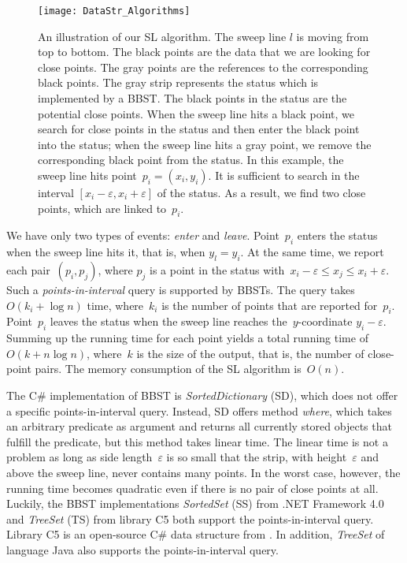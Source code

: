 \begin{figure}[tb]
\centering
\texttt{[image: DataStr\_Algorithms]}
\caption{An illustration of our SL algorithm.
	The sweep line $l$ is moving from top to bottom.
	The black points are the data that 
	we are looking for close points.
	The gray points are the references 
	to the corresponding black points.
	The gray strip represents the status which is 
	implemented by a BBST.
	The black points in the status are 
    the potential close points.
	When the sweep line hits a black point,
	we search for close points in the status and then
	enter the black point into the status;
	when the sweep line hits a gray point, 
	we remove the corresponding black point from the status.
	In this example, the sweep line hits point~$p_i=(x_i, y_i)$. 
	It is sufficient to search in the interval
	$[x_i-\varepsilon, x_i+\varepsilon]$ of the status.
	As a result, we find two close points, 
	which are linked to~$p_i$.
}
\label{fig:DataStr_SL}
\end{figure}

We have only two types of events: \emph{enter} and \emph{leave}.
Point~$p_{i} $ enters the status when the sweep line hits 
it, that is, when $y_{l}=y_{i}$. 
At the same time, we report each pair~$(p_{i},p_{j})$, where 
$p_{j}$ is a point in the status 
with~$x_{i}-\varepsilon \le x_{j}\le x_{i}+\varepsilon$. 
Such a \emph{points-in-interval} query is supported by BBSTs. 
The query takes~$O(k_{i}+\log n)$ time, 
where~$k_{i}$ is the number of points 
that are reported for~$p_{i}$.
Point~$p_{i}$ leaves the status 
when the sweep line reaches the~$y$-coordinate 
$y_{i}-\varepsilon$.
Summing up the running time for each point
yields a total running time of~$O(k+n\log n)$, 
where~$k$ is the size of the output, 
that is, the number of close-point pairs. 
The memory consumption of the SL algorithm is~$O(n)$.

The C\# implementation of BBST is \emph{SortedDictionary} (SD),
which does not offer a specific points-in-interval query. 
Instead, SD offers method \emph{where}, 
which takes an arbitrary predicate as argument 
and returns all currently stored objects 
that fulfill the predicate, but this method takes linear time. 
The linear time is not a problem 
as long as side length~$\varepsilon$ is so small 
that the strip, with height~$\varepsilon$ and above the sweep line, 
never contains many points. 
In the worst case, however, 
the running time becomes quadratic even 
if there is no pair of close points at all. 
Luckily, the BBST implementations 
\emph{SortedSet} (SS) from .NET Framework 4.0 and
\emph{TreeSet} (TS) from library C5
both support the points-in-interval query.
Library C5 is an open-source C\# data structure
from \textcite{Kokholm2006}.
In addition, \emph{TreeSet} of language Java 
also supports the points-in-interval query.



